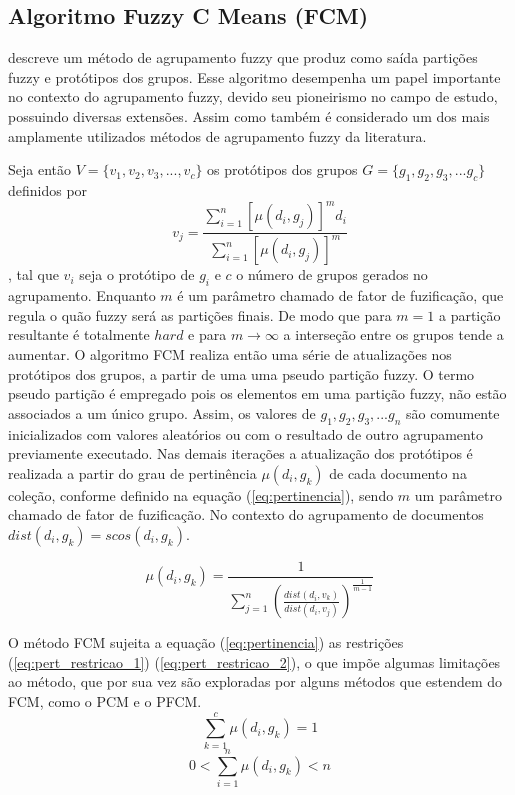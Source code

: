 \subsection{Algoritmo Fuzzy C Means (FCM)}
\cite{Bezdek1984} descreve um método de agrupamento fuzzy que produz como saída partições 
fuzzy e protótipos dos grupos. Esse algoritmo desempenha um papel importante no
contexto do agrupamento fuzzy, devido seu pioneirismo no campo de estudo, possuindo diversas
extensões. Assim como também é considerado um dos mais amplamente utilizados métodos de agrupamento
fuzzy da literatura\cite{Pal2005}.

Seja então $V = \{v_1,v_2,v_3,...,v_c\}$ os protótipos dos grupos $G = \{g_1,g_2,g_3,...g_c\}$ 
definidos por
\begin{equation}
  v_j = \frac{\sum_{i=1}^n[\mu(d_i,g_j)]^m d_i}{\sum_{i=1}^n[\mu(d_i,g_j)]^m}
\end{equation}
, 
tal que $v_i$ seja o protótipo de $g_i$ e $c$ o número de grupos gerados no agrupamento. Enquanto
$m$ é um parâmetro chamado de fator de fuzificação, que regula o quão fuzzy será as partições
finais. De modo que para $m = 1$ a partição resultante é totalmente $hard$ e para 
$m \rightarrow \infty$ a interseção entre os grupos tende a 
aumentar\cite{Pal2005}\cite{Nogueira2013}.
O algoritmo FCM realiza então uma série de atualizações 
nos protótipos dos grupos, a partir de uma uma pseudo partição fuzzy. 
O termo pseudo partição é empregado pois os elementos em uma partição fuzzy, não estão associados 
a um único grupo. Assim, os valores de $g_1,g_2,g_3,...g_n$ são comumente inicializados 
com valores aleatórios\cite{Nogueira2013} ou com o resultado de outro agrupamento previamente 
executado\cite{Pal2005}\cite{Krishnapuram1993}. Nas demais iterações a atualização dos protótipos é
realizada a partir do grau de pertinência $\mu(d_i,g_k)$ de cada documento na coleção, conforme
definido na equação (\ref{eq:pertinencia}), sendo $m$ um parâmetro chamado de fator de 
fuzificação. No contexto do agrupamento de documentos $dist(d_i,g_k) = scos(d_i,g_k)$.

\begin{equation}
  \mu(d_i,g_k) = \frac{1}{\sum_{j=1}^n(\frac{dist(d_i,v_k)}{dist(d_i,v_j)})^{\frac{1}{m-1}}}
  \label{eq:pertinencia}
\end{equation}

O método FCM sujeita a equação (\ref{eq:pertinencia}) as restrições (\ref{eq:pert_restricao_1})
(\ref{eq:pert_restricao_2}), o que impõe algumas limitações ao método, que por sua vez são 
exploradas por alguns métodos que estendem do FCM, como o PCM e o PFCM.
\begin{equation}
  \sum_{k=1}^c \mu(d_i,g_k) = 1
  \label{eq:pert_restricao_1}
\end{equation}
\begin{equation}
  0 < \sum_{i=1}^n \mu(d_i,g_k) < n 
  \label{eq:pert_restricao_2}
\end{equation}





